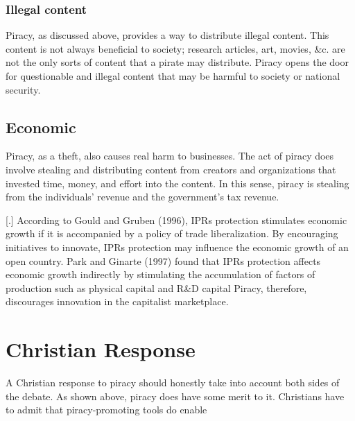 \documentclass[onecolumn, 12pt]{article}
\begin{document}

\subsubsection{Illegal content}
Piracy, as discussed above, provides a way to distribute illegal content. This
content is not always beneficial to society; research articles, art, movies, \&c.
are not the only sorts of content that a pirate may distribute. Piracy opens
the door for questionable and illegal content that may be harmful to society
or national security.


\subsection{Economic}
Piracy, as a theft, also causes real harm to businesses. The act of piracy
does involve stealing and distributing content from creators and organizations
that invested time, money, and effort into the content. In this sense, piracy
is stealing from the individuals' revenue and the government's tax
revenue.~\cite{congress:pirating-the-american-dream}

[.]{%
  According to Gould and Gruben (1996), IPRs protection stimulates economic
  growth if it is accompanied by a policy of trade liberalization. By
  encouraging initiatives to innovate, IPRs protection may influence the
  economic growth of an open country. Park and Ginarte (1997) found that IPRs
  protection affects economic growth indirectly by stimulating the accumulation
  of factors of production such as physical capital and R\&D capital%
}
Piracy, therefore, discourages innovation in the capitalist marketplace.

\section{Christian Response}
A Christian response to piracy should honestly take into account both sides of
the debate. As shown above, piracy does have some merit to it. Christians have
to admit that piracy-promoting tools do enable 

\end{document}
